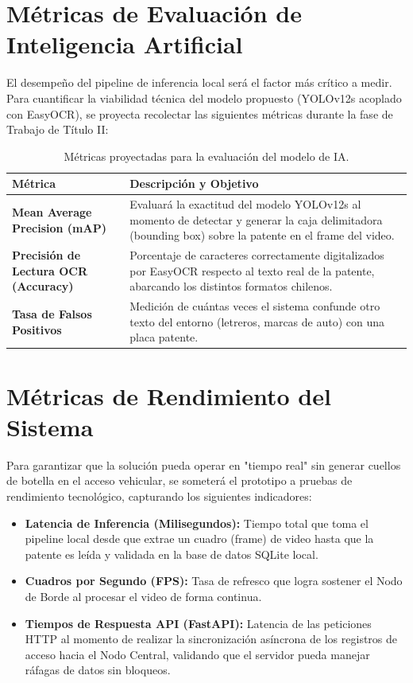 \section{Métricas de Evaluación de Inteligencia Artificial}

El desempeño del pipeline de inferencia local será el factor más crítico a medir. Para cuantificar la viabilidad técnica del modelo propuesto (YOLOv12s acoplado con EasyOCR), se proyecta recolectar las siguientes métricas durante la fase de Trabajo de Título II:

\begin{table}[H]
    \centering
    \caption{Métricas proyectadas para la evaluación del modelo de IA.}
    \begin{tabular}{|p{4cm}|p{10cm}|}
        \hline
        \textbf{Métrica} & \textbf{Descripción y Objetivo} \\ \hline
        \textbf{Mean Average Precision (mAP)} & Evaluará la exactitud del modelo YOLOv12s al momento de detectar y generar la caja delimitadora (bounding box) sobre la patente en el frame del video. \\ \hline
        \textbf{Precisión de Lectura OCR (Accuracy)} & Porcentaje de caracteres correctamente digitalizados por EasyOCR respecto al texto real de la patente, abarcando los distintos formatos chilenos. \\ \hline
        \textbf{Tasa de Falsos Positivos} & Medición de cuántas veces el sistema confunde otro texto del entorno (letreros, marcas de auto) con una placa patente. \\ \hline
    \end{tabular}
    \label{tab:metricas_ia}
\end{table}

\section{Métricas de Rendimiento del Sistema}

Para garantizar que la solución pueda operar en "tiempo real" sin generar cuellos de botella en el acceso vehicular, se someterá el prototipo a pruebas de rendimiento tecnológico, capturando los siguientes indicadores:

\begin{itemize}
    \item \textbf{Latencia de Inferencia (Milisegundos):} Tiempo total que toma el pipeline local desde que extrae un cuadro (frame) de video hasta que la patente es leída y validada en la base de datos SQLite local.
    \item \textbf{Cuadros por Segundo (FPS):} Tasa de refresco que logra sostener el Nodo de Borde al procesar el video de forma continua.
    \item \textbf{Tiempos de Respuesta API (FastAPI):} Latencia de las peticiones HTTP al momento de realizar la sincronización asíncrona de los registros de acceso hacia el Nodo Central, validando que el servidor pueda manejar ráfagas de datos sin bloqueos.
\end{itemize}

 

